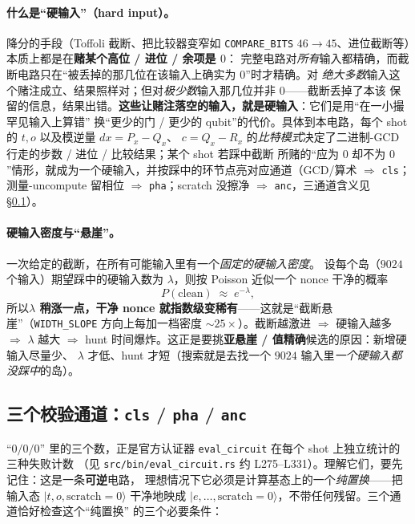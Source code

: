 \documentclass[11pt]{ctexart}
\let\c\lstinline
\begin{document}
\paragraph{什么是``硬输入''（hard input）。}降分的手段（Toffoli 截断、把比较器变窄如
\c{COMPARE_BITS} $46{\to}45$、进位截断等）本质上都是在\textbf{赌某个高位 / 进位 / 余项是 $0$}：
完整电路对\emph{所有}输入都精确，而截断电路只在``被丢掉的那几位在该输入上确实为 $0$''时才精确。对
\emph{绝大多数}输入这个赌注成立、结果照样对；但对\emph{极少数}输入那几位并非 $0$——截断丢掉了本该
保留的信息，结果出错。\textbf{这些让赌注落空的输入，就是硬输入}：它们是用``在一小撮罕见输入上算错''
换``更少的门 / 更少的 qubit''的代价。具体到本电路，每个 shot 的 $t,o$ 以及模逆量 $dx=P_x{-}Q_x$、
$c=Q_x{-}R_x$ 的\emph{比特模式}决定了二进制-GCD 行走的步数 / 进位 / 比较结果；某个 shot 若踩中截断
所赌的``应为 $0$ 却不为 $0$''情形，就成为一个硬输入，并按踩中的环节点亮对应通道（GCD/算术
$\Rightarrow$ \texttt{cls}；测量-uncompute 留相位 $\Rightarrow$ \texttt{pha}；scratch 没擦净
$\Rightarrow$ \texttt{anc}，三通道含义见 §\ref{sec:channels}）。

\paragraph{硬输入密度与``悬崖''。}一次给定的截断，在所有可能输入里有一个\emph{固定的硬输入密度}。
设每个岛（$9024$ 个输入）期望踩中的硬输入数为 $\lambda$，则按 Poisson 近似一个 nonce 干净的概率
\[
  P(\text{clean}) \;\approx\; e^{-\lambda},
\]
所以\textbf{$\lambda$ 稍涨一点，干净 nonce 就指数级变稀有}——这就是``截断悬崖''（\c{WIDTH_SLOPE}
方向上每加一档密度 $\sim 25\times$）。截断越激进 $\Rightarrow$ 硬输入越多 $\Rightarrow$ $\lambda$
越大 $\Rightarrow$ hunt 时间爆炸。这正是要挑\textbf{亚悬崖 / 值精确}候选的原因：新增硬输入尽量少、
$\lambda$ 才低、hunt 才短（搜索就是去找一个 $9024$ 输入里\emph{一个硬输入都没踩中}的岛）。

\subsection{三个校验通道：\texttt{cls} / \texttt{pha} / \texttt{anc}}
\label{sec:channels}
``$0/0/0$'' 里的三个数，正是官方认证器 \c{eval_circuit} 在每个 shot 上独立统计的三种失败计数
（见 \c{src/bin/eval_circuit.rs} 约 L275--L331）。理解它们，要先记住：这是一条\textbf{可逆}电路，
理想情况下它必须是计算基态上的一个\emph{纯置换}——把输入态 $\lvert t,o,\text{scratch}{=}0\rangle$
干净地映成 $\lvert e,\dots,\text{scratch}{=}0\rangle$，不带任何残留。三个通道恰好检查这个``纯置换''
的三个必要条件：
\end{document}
